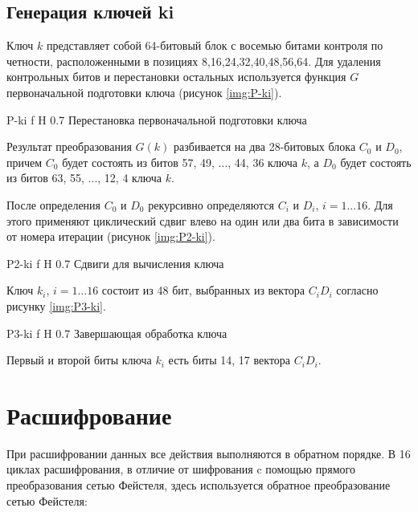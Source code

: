 \subsection{Генерация ключей ki}

Ключ $k$ представляет собой 64-битовый блок с восемью битами контроля по четности, расположенными в позициях 8,16,24,32,40,48,56,64. Для удаления контрольных битов и перестановки остальных используется функция $G$ первоначальной подготовки ключа (рисунок \ref{img:P-ki}).

{P-ki} %
{f} %
{H} %
{0.7\textwidth} %
{Перестановка первоначальной подготовки ключа} %

Результат преобразования $G(k)$ разбивается на два 28-битовых блока $C_0$ и $D_0$, причем $C_0$ будет состоять из битов 57, 49, ..., 44, 36 ключа $k$, а $D_0$ будет состоять из битов 63, 55, ..., 12, 4 ключа $k$. 

После определения $C_0$ и $D_0$ рекурсивно определяются $C_i$ и $D_i$, $i=1\ldots16$. Для этого применяют циклический сдвиг влево на один или два бита в зависимости от номера итерации (рисунок \ref{img:P2-ki}).

{P2-ki} %
{f} %
{H} %
{0.7\textwidth} %
{Сдвиги для вычисления ключа} %

Ключ $k_i$, $i=1\ldots16$ состоит из 48 бит, выбранных из вектора $C_iD_i$ согласно рисунку \ref{img:P3-ki}.

{P3-ki} %
{f} %
{H} %
{0.7\textwidth} %
{Завершающая обработка ключа} %

Первый и второй биты ключа $k_i$ есть биты 14, 17 вектора $C_iD_i$.

\section{Расшифрование}

При расшифровании данных все действия выполняются в обратном порядке. В 16 циклах расшифрования, в отличие от шифрования c помощью прямого преобразования сетью Фейстеля, здесь используется обратное преобразование сетью Фейстеля:

